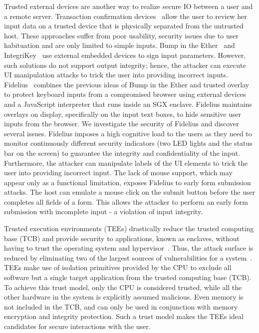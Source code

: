 Trusted external devices are another way to realize secure IO between a user and a remote server. Transaction confirmation devices~\cite{filyanov2011uni,weigold2011secure} allow the user to review her input data on a trusted device that is physically separated from the untrusted host. These approaches suffer from poor usability, security issues due to user habituation and are only limited to simple inputs. Bump in the Ether~\cite{McCPerRei2006} and IntegriKey~\cite{IntegriKey} use external embedded devices to sign input parameters. However, such solutions do not support output integrity; hence, the attacker can execute UI manipulation attacks to trick the user into providing incorrect inputs. Fidelius~\cite{Fidelius} combines the previous ideas of Bump in the Ether and trusted overlay to protect keyboard inputs from a compromised browser using external devices and a JavaScript interpreter that runs inside an SGX enclave. Fidelius maintains overlays on display, specifically on the input text boxes, to hide sensitive user inputs from the browser. We investigate the security of Fidelius and discover several issues. Fidelius imposes a high cognitive load to the users as they need to monitor continuously different security indicators (two LED lights and the status bar on the screen) to guarantee the integrity and confidentiality of the input. Furthermore, the attacker can manipulate labels of the UI elements to trick the user into providing incorrect input. 
The lack of mouse support, which may appear only as a functional limitation, exposes Fidelius to early form submission attacks. The host can emulate a mouse click on the submit button before the user completes all fields of a form. This allows the attacker to perform an early form submission with incomplete input - a violation of input integrity. 

Trusted execution environments (TEEs) drastically reduce the trusted computing base (TCB) and provide security to applications, known as enclaves, without having to trust the operating system and hypervisor~\cite{costan2016intel,winter2008trusted,costan2016sanctum}. Thus, the attack surface is reduced by eliminating two of the largest sources of vulnerabilities for a system~\cite{checkoway2013iago,suzaki2011memory}. TEEs make use of isolation primitives provided by the CPU to exclude all software but a single target application from the trusted computing base (TCB). To achieve this trust model, only the CPU is considered trusted, while all the other hardware in the system is explicitly assumed malicious. Even memory is not included in the TCB, and can only be used in conjunction with memory encryption and integrity protection. Such a trust model makes the TEEs ideal candidates for secure interactions with the user. 


